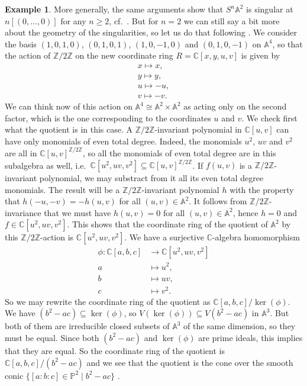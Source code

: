\documentclass[12pt,a4paper]{amsart}
\theoremstyle{plain}
\theoremstyle{definition}
\newtheorem{exmp}[thm]{Example}
\theoremstyle{remark}
\begin{document}
\begin{exmp}
  More generally, the same arguments show that $S^{n}\mathbb{A}^{2}$ is singular at $n[(0,\ldots,0)]$ for any $n \geq 2$, cf.~\cite[Example 3.5]{rot16}.
  But for $n = 2$ we can still say a bit more about the geometry of the singularities, so let us do that following \cite[Example 3.6]{rot16}.
  We consider the basis $(1, 0, 1, 0)$, $(0, 1, 0, 1)$, $(1, 0, -1, 0)$ and $(0, 1, 0, -1)$ on $\mathbb{A}^{4}$, so that the action of $\mathbb{Z}/2\mathbb{Z}$ on the new coordinate ring $R = \mathbb{C}[x, y, u, v]$ is given by
  \begin{align*}
    x \mapsto x, \\
    y \mapsto y, \\
    u \mapsto -u, \\
    v \mapsto -v.
  \end{align*}
  We can think now of this action on $\mathbb{A}^{4} \cong \mathbb{A}^{2} \times \mathbb{A}^{2}$ as acting only on the second factor, which is the one corresponding to the coordinates $u$ and $v$.
  We check first what the quotient is in this case.
  A $\mathbb{Z}/2\mathbb{Z}$-invariant polynomial in $\mathbb{C}[u,v]$ can have only monomials of even total degree.
  Indeed, the monomials $u^{2}$, $uv$ and $v^{2}$ are all in $\mathbb{C}[u,v]^{\mathbb{Z}/2\mathbb{Z}}$, so all the monomials of even total degree are in this subalgebra as well, i.e.~$\mathbb{C}[u^{2}, uv, v^{2}] \subseteq \mathbb{C}[u,v]^{\mathbb{Z}/2\mathbb{Z}}$.
  If $f(u,v)$ is a $\mathbb{Z}/2\mathbb{Z}$-invariant polynomial, we may substract from it all its even total degree monomials.
  The result will be a $\mathbb{Z}/2\mathbb{Z}$-invariant polynomial $h$ with the property that $h(-u,-v) = -h(u,v)$ for all $(u, v) \in \mathbb{A}^{2}$.
  It follows from $\mathbb{Z}/2\mathbb{Z}$-invariance that we must have $h(u,v) = 0$ for all $(u, v) \in \mathbb{A}^{2}$, hence $h = 0$ and $f \in \mathbb{C}[u^{2},uv,v^{2}]$.
  This shows that the coordinate ring of the quotient of $\mathbb{A}^{2}$ by this $\mathbb{Z}/2\mathbb{Z}$-action is $\mathbb{C}[u^{2}, uv, v^{2}]$.
  We have a surjective $\mathbb{C}$-algebra homomorphism
  \begin{align*}
    \phi \colon \mathbb{C}[a,b,c] & \longrightarrow \mathbb{C}[u^{2}, uv, v^{2}] \\
    a & \longmapsto u^{2}, \\
    b & \longmapsto uv, \\
    c & \longmapsto v^{2}.
  \end{align*}
  So we may rewrite the coordinate ring of the quotient as $\mathbb{C}[a,b,c]/\ker(\phi)$.
  We have $(b^{2} - ac) \subseteq \ker(\phi)$, so $V(\ker(\phi)) \subseteq V(b^{2} - ac)$ in $\mathbb{A}^{3}$.
  But both of them are irreducible closed subsets of $\mathbb{A}^{3}$ of the same dimension, so they must be equal.
  Since both $(b^{2} - ac)$ and $\ker(\phi)$ are prime ideals, this implies that they are equal.
  So the coordinate ring of the quotient is $\mathbb{C}[a,b,c]/(b^{2} - ac)$ and we see that the quotient is the cone over the smooth conic $\{ [a:b:c] \in \mathbb{P}^{2} \mid b^{2} - ac \}$ \cite[Exercise I.2.10]{har77}.
  

\end{exmp}
\end{document}
